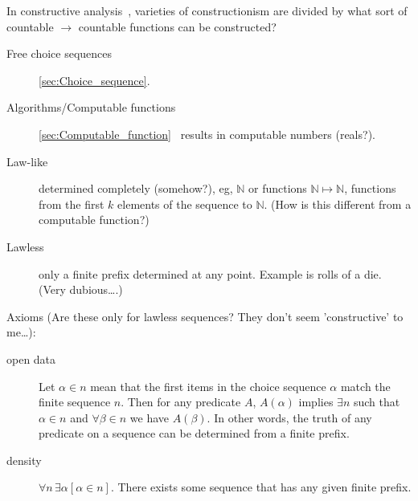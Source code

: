 \label{Constructive analysis}

In constructive 
analysis~\cite{wiki:Constructive_analysis,
bridger2019,henle_2012_numbers},
varieties of constructionism are divided by
what sort of countable $\rightarrow$ countable functions can be 
constructed?~\cite{wiki:Constructivism_philosophy_of_mathematics}
\begin{description}
\item[Free choice sequences] 
\autoref{sec:Choice_sequence}\cite{wiki:Choice_sequence}.
\item[Algorithms/Computable functions] 
\autoref{sec:Computable_function}~\cite{wiki:Computable_function}
 results in computable numbers (reals?).
\end{description}

\label{sec:Choice_sequences}

\begin{description}
\item[Law-like] determined completely (somehow?),
eg, $\mathbb{N}$ or functions $\mathbb{N} \mapsto \mathbb{N}$,
functions from the first $k$ elements of the sequence to 
$\mathbb{N}$.
(How is this different from a computable function?)
\item[Lawless] only a finite prefix determined at any point.
Example is rolls of a die. (Very dubious\ldots.)
\end{description}

Axioms 
(Are these only for lawless sequences?
They don't seem 'constructive' to me\ldots):
\begin{description}
\item[open data] Let $\alpha \in n$ mean that the first items
in the choice sequence $\alpha$ match the finite sequence $n$.
Then for any predicate $A$,
$A(\alpha )$ implies  $\exists n$ such that
$\alpha \in n$ and $\forall \beta \in n$ we have $A(\beta )$.
In other words, the truth of any predicate on a sequence can be
determined from a finite prefix.
\item[density] $\forall n\,\exists \alpha [\alpha \in n]$.
There exists some sequence that has any given finite prefix.
\end{description}


\label{sec:Computable_function}
\cite{wiki:Computable_function}

